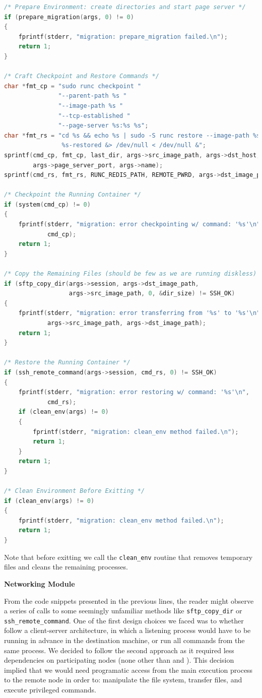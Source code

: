 \begin{lstlisting}[language=C,caption={Snippet for the last (stopping) checkpoint and remote restore.\label{code:last-cp}}]
/* Prepare Environment: create directories and start page server */
if (prepare_migration(args, 0) != 0)
{
    fprintf(stderr, "migration: prepare_migration failed.\n");
    return 1;
}

/* Craft Checkpoint and Restore Commands */
char *fmt_cp = "sudo runc checkpoint "
               "--parent-path %s "
               "--image-path %s "
               "--tcp-established "
               "--page-server %s:%s %s";
char *fmt_rs = "cd %s && echo %s | sudo -S runc restore --image-path %s \
                %s-restored &> /dev/null < /dev/null &";
sprintf(cmd_cp, fmt_cp, last_dir, args->src_image_path, args->dst_host,
        args->page_server_port, args->name);
sprintf(cmd_rs, fmt_rs, RUNC_REDIS_PATH, REMOTE_PWRD, args->dst_image_path, args->name);

/* Checkpoint the Running Container */
if (system(cmd_cp) != 0)
{
    fprintf(stderr, "migration: error checkpointing w/ command: '%s'\n",
            cmd_cp);
    return 1;
}

/* Copy the Remaining Files (should be few as we are running diskless) */
if (sftp_copy_dir(args->session, args->dst_image_path, 
                  args->src_image_path, 0, &dir_size) != SSH_OK)
{
    fprintf(stderr, "migration: error transferring from '%s' to '%s'\n",
            args->src_image_path, args->dst_image_path);
    return 1;
}

/* Restore the Running Container */
if (ssh_remote_command(args->session, cmd_rs, 0) != SSH_OK)
{
    fprintf(stderr, "migration: error restoring w/ command: '%s'\n",
            cmd_rs);
    if (clean_env(args) != 0)
    {
        fprintf(stderr, "migration: clean_env method failed.\n");
        return 1;
    }
    return 1;
}

/* Clean Environment Before Exitting */
if (clean_env(args) != 0)
{
    fprintf(stderr, "migration: clean_env method failed.\n");
    return 1;
}
\end{lstlisting}
Note that before exitting we call the \texttt{clean\_env} routine that removes temporary files and cleans the remaining processes.

\textbf{Networking Module}

From the code snippets presented in the previous lines, the reader might observe a series of calls to some seemingly unfamiliar methods like \texttt{sftp\_copy\_dir} or \texttt{ssh\_remote\_command}.
One of the first design choices we faced was to whether follow a client-server architecture, in which a listening process would have to be running in advance in the destination machine, or run all commands from the same process.
We decided to follow the second approach as it required less dependencies on participating nodes (none other than \criu and \runc).
This decision implied that we would need programatic access from the main execution process to the remote node in order to: manipulate the file system, transfer files, and execute privileged commands.

